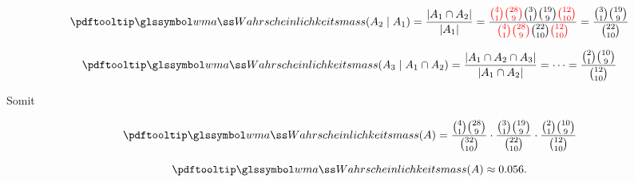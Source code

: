 \begin{bsp}
    \[
        \pe(A_2\mid A_1)
        =
        \frac{|A_1\cap A_2|}{|A_1|}
        =
        \frac{\textcolor{red}{\binom{4}{1}\binom{28}{9}}\binom{3}{1}\binom{19}{9}\textcolor{red}{\binom{12}{10}}}
        {\textcolor{red}{\binom{4}{1}\binom{28}{9}}\binom{22}{10}\textcolor{red}{\binom{12}{10}}}
        =
        \frac{\binom{3}{1}\binom{19}{9}}
        {\binom{22}{10}}
    \]

    \[
        \pe(A_3\mid A_1\cap A_2)
        =
        \frac{|A_1\cap A_2\cap A_3|}
        {|A_1\cap A_2|}
        = \dots =
        \frac{\binom{2}{1}\binom{10}{9}}
        {\binom{12}{10}}
    \]

    Somit

    \[
        \pe(A)
        =
        \frac{\binom{4}{1}\binom{28}{9}}
        {\binom{32}{10}}
        \cdot
        \frac{\binom{3}{1}\binom{19}{9}}
        {\binom{22}{10}}
        \cdot
        \frac{\binom{2}{1}\binom{10}{9}}
        {\binom{12}{10}}
    \]

    \[
        \pe(A)\approx 0.056.
    \]
\end{bsp}
